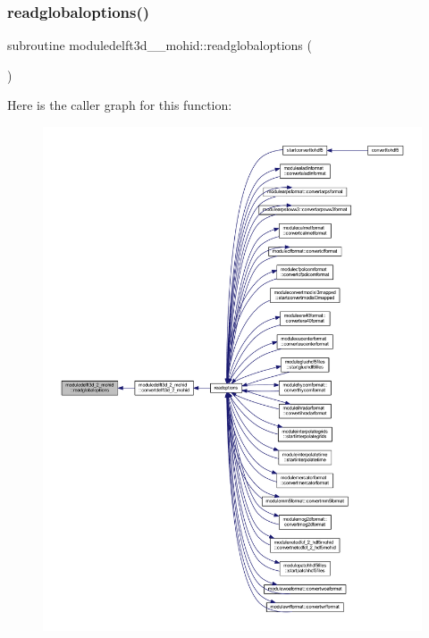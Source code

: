 \subsubsection{\texorpdfstring{readglobaloptions()}{readglobaloptions()}}
{\footnotesize\ttfamily subroutine moduledelft3d\+\_\+\_\+mohid\+::readglobaloptions (\begin{DoxyParamCaption}{ }\end{DoxyParamCaption})\hspace{0.3cm}{\ttfamily [private]}}

Here is the caller graph for this function\+:\nopagebreak
\begin{figure}[H]
\begin{center}
\leavevmode
\includegraphics[width=350pt]{namespacemoduledelft3d__2__mohid_aa82a4835cdddf9eddf65ba75c51cff92_icgraph}
\end{center}
\end{figure}
\mbox{\label{namespacemoduledelft3d__2__mohid_a04640ef3827cfdf73681b2b4ed0f3884}} 
